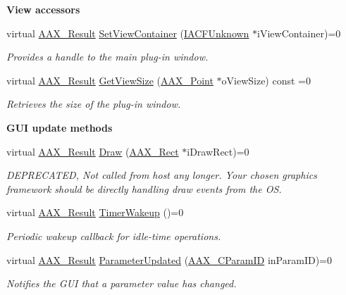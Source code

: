 \begin{Indent}{\bf View accessors}\par
\begin{DoxyCompactItemize}
\item 
virtual \hyperlink{a00149_a4d8f69a697df7f70c3a8e9b8ee130d2f}{A\+A\+X\+\_\+\+Result} \hyperlink{a00060_a50830385c58f104c87b6ef25144b30dd}{Set\+View\+Container} (\hyperlink{a00146}{I\+A\+C\+F\+Unknown} $\ast$i\+View\+Container)=0
\begin{DoxyCompactList}\small\item\em Provides a handle to the main plug-\/in window. \end{DoxyCompactList}\item 
virtual \hyperlink{a00149_a4d8f69a697df7f70c3a8e9b8ee130d2f}{A\+A\+X\+\_\+\+Result} \hyperlink{a00060_ae67c876225e9b5c538560d19a842a34c}{Get\+View\+Size} (\hyperlink{a00119}{A\+A\+X\+\_\+\+Point} $\ast$o\+View\+Size) const =0
\begin{DoxyCompactList}\small\item\em Retrieves the size of the plug-\/in window. \end{DoxyCompactList}\end{DoxyCompactItemize}
\end{Indent}
\begin{Indent}{\bf G\+U\+I update methods}\par
\begin{DoxyCompactItemize}
\item 
virtual \hyperlink{a00149_a4d8f69a697df7f70c3a8e9b8ee130d2f}{A\+A\+X\+\_\+\+Result} \hyperlink{a00060_a4b132a0bc22ba443027998a56e4eadfb}{Draw} (\hyperlink{a00120}{A\+A\+X\+\_\+\+Rect} $\ast$i\+Draw\+Rect)=0
\begin{DoxyCompactList}\small\item\em D\+E\+P\+R\+E\+C\+A\+T\+E\+D, Not called from host any longer. Your chosen graphics framework should be directly handling draw events from the O\+S. \end{DoxyCompactList}\item 
virtual \hyperlink{a00149_a4d8f69a697df7f70c3a8e9b8ee130d2f}{A\+A\+X\+\_\+\+Result} \hyperlink{a00060_aafa484110d39046de1f927f30c9da387}{Timer\+Wakeup} ()=0
\begin{DoxyCompactList}\small\item\em Periodic wakeup callback for idle-\/time operations. \end{DoxyCompactList}\item 
virtual \hyperlink{a00149_a4d8f69a697df7f70c3a8e9b8ee130d2f}{A\+A\+X\+\_\+\+Result} \hyperlink{a00060_a45b468fef806611581f748af9301ab4d}{Parameter\+Updated} (\hyperlink{a00149_a1440c756fe5cb158b78193b2fc1780d1}{A\+A\+X\+\_\+\+C\+Param\+I\+D} in\+Param\+I\+D)=0
\begin{DoxyCompactList}\small\item\em Notifies the G\+U\+I that a parameter value has changed. \end{DoxyCompactList}\end{DoxyCompactItemize}
\end{Indent}
